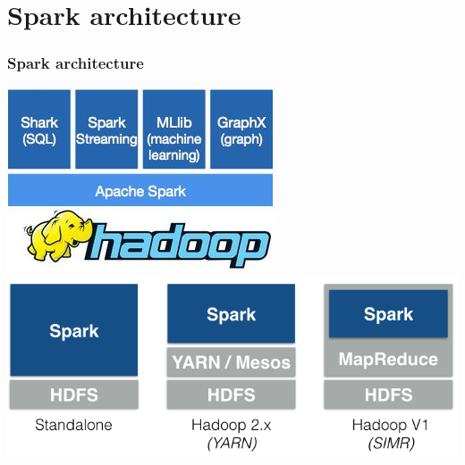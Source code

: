\documentclass{beamer}
\begin{document}
\section{Spark architecture}
\begin{frame}
\frametitle{Spark architecture}
\begin{center}
\includegraphics[height=0.4\textheight]{img/SparkHadoop.png}
\vspace{1em}
\includegraphics[height=0.4\textheight]{img/spark-on-hadoop.png}

\end{center}

\end{frame}
\end{document}
